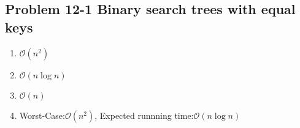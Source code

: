 \subsection*{Problem 12-1 Binary search trees with equal keys}
\begin{enumerate}
	\item	$\mathcal{O}(n^2)$
	\item	$\mathcal{O}(n \log{n})$
	\item	$\mathcal{O}(n)$
	\item	Worst-Case:$\mathcal{O}(n^2)$, Expected runnning time:$\mathcal{O}(n \log{n})$
\end{enumerate}

